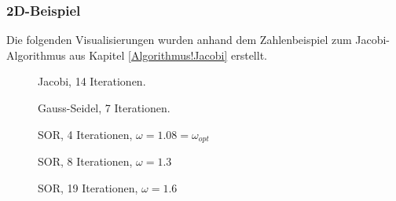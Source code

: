 \begin{refsection}
\subsubsection{2D-Beispiel}
Die folgenden Visualisierungen wurden anhand dem Zahlenbeispiel zum
Jacobi-Algorithmus aus Kapitel \ref{Algorithmus!Jacobi} erstellt.
\begin{figure}[!ht]\centering
\caption{Jacobi, 14 Iterationen.}
\label{fig:Jac. 2D Bsp}
\end{figure}
\begin{figure}[!ht]\centering
\caption{Gauss-Seidel, 7 Iterationen.}
\label{fig:G.-S. 2D Bsp}
\end{figure}
\begin{figure}[!ht]\centering
\caption{SOR, 4 Iterationen, $\omega=1.08=\omega_{opt}$}
\label{fig:SOR w=1.08= 2D Bsp}
\end{figure}

\begin{figure}[!ht]\centering
\caption{SOR, 8 Iterationen, $\omega=1.3$}
\label{fig:SOR w=1.3 2D Bsp}
\end{figure}
\begin{figure}[!ht]\centering
\caption{SOR, 19 Iterationen, $\omega=1.6$}
\label{fig:SOR w=1.6 2D Bsp}
\end{figure}
	

\end{refsection}
